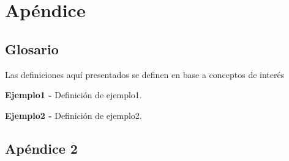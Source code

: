 \documentclass[12pt]{article}
\begin{document}
\appendix
\section{Apéndice}
\subsection{Glosario}
Las definiciones aquí presentados se definen en base a conceptos de interés

\textbf{Ejemplo1 -} Definición de ejemplo1.

\textbf{Ejemplo2 -} Definición de ejemplo2.

\subsection{Apéndice 2} %


\end{document}
